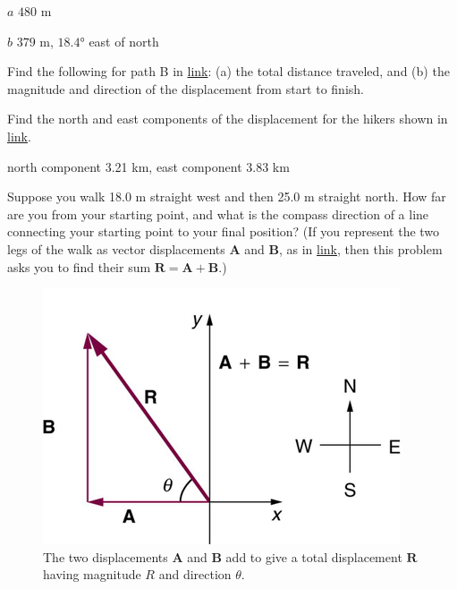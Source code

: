 \documentclass[
]{book}
\begin{document}
\leavevmode{}%
\(a\) \(\text{480\ m}{}\)

\(b\) \(\text{379\ m}{}\), \(\text{18.4°}{}\) east of north

\hypertarget{fs-id1165298474424}{}
\leavevmode{}%
Find the following for path B in
\protect\hyperlink{import-auto-id1165298872310}{link}: (a) the
total distance traveled, and (b) the magnitude and direction of the
displacement from start to finish.

\hypertarget{fs-id1165298867580}{}
\leavevmode{}%
Find the north and east components of the displacement for the hikers
shown in \protect\hyperlink{import-auto-id1165298840401}{link}.

\leavevmode{}%
north component 3.21 km, east component 3.83 km

\hypertarget{fs-id1165298536705}{}
\leavevmode{}%
Suppose you walk 18.0 m straight west and then 25.0 m straight north.
How far are you from your starting point, and what is the compass
direction of a line connecting your starting point to your final
position? (If you represent the two legs of the walk as vector
displacements \(\textbf{A}{}\) and \(\textbf{B}{}\), as in
\protect\hyperlink{import-auto-id1165296241785}{link}, then this
problem asks you to find their sum
\({\textbf{R} = \textbf{A} + \textbf{B}}{}\).)

\begin{figure}
\hypertarget{import-auto-id1165296241785}{%
\centering
\includegraphics{images/Figure_03_02_21a.jpg}
\caption{The two displacements \(\mathbf{A}{}\) and \(\mathbf{B}{}\) add to give a
total displacement \(\mathbf{R}{}\) having magnitude \(R{}\) and direction
\(\theta{}\).}\label{import-auto-id1165296241785}
}
\end{figure}
\end{document}
